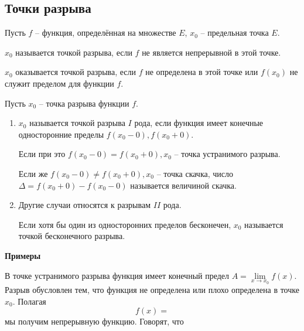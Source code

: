 \subsection{Точки разрыва}
\begin{Definition}
  Пусть $f$ -- функция, определённая на множестве $E$, $x_0$ -- предельная точка $E$.

  $x_0$ называется точкой разрыва, если $f$ не является непрерывной в этой точке.

  $x_0$ оказывается точкой разрыва, если $f$ не определена в этой точке или $f(x_0)$ не служит пределом для функции $f$.
\end{Definition}
\begin{Definition}
  Пусть $x_0$ -- точка разрыва функции $f$.
\begin{enumerate}
  \item $x_0$ называется точкой разрыва $I$ рода, если функция имеет конечные односторонние пределы $f(x_0 - 0), f(x_0 + 0)$.

  Если при это $f(x_0 - 0) = f(x_0 + 0), x_0$ -- точка устранимого разрыва.

  Если же $f(x_0 - 0) \neq f(x_0 + 0), x_0$ -- точка скачка, число $\Delta = f(x_0 + 0) - f(x_0 - 0)$ называется величиной скачка.
  \item Другие случаи относятся к разрывам $II$ рода.

  Если хотя бы один из односторонних пределов бесконечен, $x_0$ называется точкой бесконечного разрыва.
\end{enumerate}
\end{Definition}
\par\medskip \textbf{Примеры}\par
В точке устранимого разрыва функция имеет конечный предел $A = \lim\limits_{x \rightarrow x_0} f(x)$. Разрыв обусловлен тем, что функция не определена или плохо определена в точке $x_0$. Полагая
$$f(x) = $$
мы получим непрерывную функцию. Говорят, что
